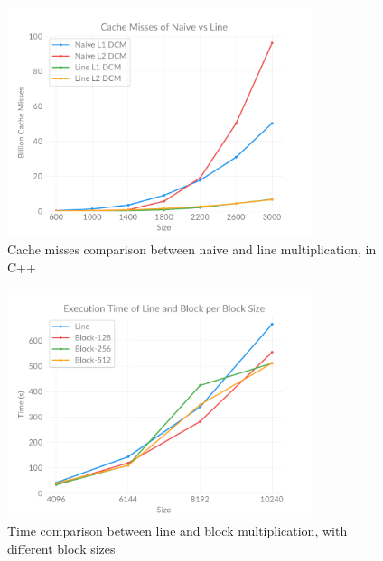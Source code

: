     \begin{figure}[h]
        \centering
        \captionsetup{justification=centering, margin=2cm}
        \includegraphics[width=0.8\textwidth]{pdf/naive-line-cache}
        \caption{Cache misses comparison between naive and line multiplication, in C++}
        \label{fig:chart:naive-line-cache}
    \end{figure}

    \begin{figure}[h]
        \centering
        \captionsetup{justification=centering, margin=2cm}
        \includegraphics[width=0.8\textwidth]{pdf/line-block-time}
        \caption{Time comparison between line and block multiplication, with different block sizes}
        \label{fig:chart:line-block-time}
    \end{figure}

